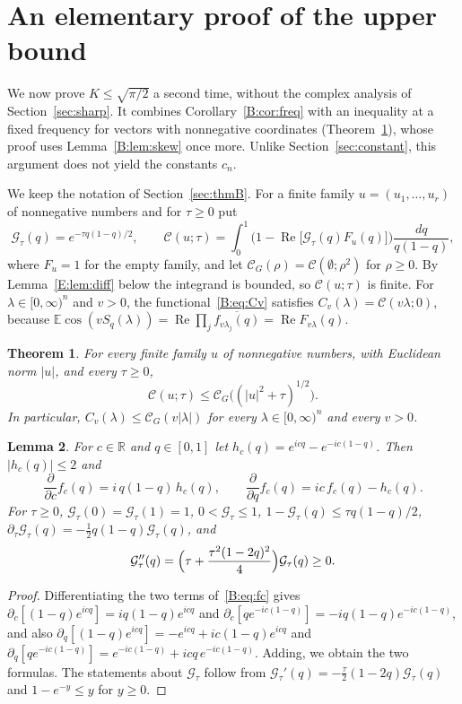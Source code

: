 \documentclass[11pt]{amsart}
\newtheorem{theorem}{Theorem}[section]
\newtheorem{lemma}[theorem]{Lemma}
\theoremstyle{remark}
\numberwithin{equation}{section}
\newcommand{\R}{\mathbb{R}}
\newcommand{\E}{\mathbb{E}}
\begin{document}
\section{An elementary proof of the upper bound}\label{sec:elem}

We now prove $K\le\sqrt{\pi/2}$ a second time, without the complex analysis of Section~\ref{sec:sharp}. It combines Corollary~\ref{B:cor:freq} with an inequality at a fixed frequency for vectors with nonnegative coordinates (Theorem~\ref{E:thm:pfa}), whose proof uses Lemma~\ref{B:lem:skew} once more. Unlike Section~\ref{sec:constant}, this argument does not yield the constants $c_n$.

We keep the notation of Section~\ref{sec:thmB}. For a finite family $u=(u_1,\dots,u_r)$ of nonnegative numbers and for $\tau\ge0$ put
\[
\mathcal G_\tau(q)=e^{-\tau q(1-q)/2},\qquad \mathcal C(u;\tau)=\int_0^1\bigl(1-\operatorname{Re}\bigl[\mathcal G_\tau(q)F_u(q)\bigr]\bigr)\frac{dq}{q(1-q)},
\]
where $F_u=1$ for the empty family, and let $\mathcal C_G(\rho)=\mathcal C(\emptyset;\rho^2)$ for $\rho\ge0$. By Lemma~\ref{E:lem:diff} below the integrand is bounded, so $\mathcal C(u;\tau)$ is finite. For $\lambda\in[0,\infty)^n$ and $v>0$, the functional~\eqref{B:eq:Cv} satisfies $C_v(\lambda)=\mathcal C(v\lambda;0)$, because $\E\cos(vS_q(\lambda))=\operatorname{Re}\prod_j\overline{f_{v\lambda_j}(q)}=\operatorname{Re}F_{v\lambda}(q)$.

\begin{theorem}\label{E:thm:pfa}
For every finite family $u$ of nonnegative numbers, with Euclidean norm $|u|$, and every $\tau\ge0$,
\[
\mathcal C(u;\tau)\le\mathcal C_G\bigl((|u|^2+\tau)^{1/2}\bigr).
\]
In particular, $C_v(\lambda)\le\mathcal C_G(v|\lambda|)$ for every $\lambda\in[0,\infty)^n$ and every $v>0$.
\end{theorem}

\begin{lemma}\label{E:lem:ident}
For $c\in\R$ and $q\in[0,1]$ let $h_c(q)=e^{icq}-e^{-ic(1-q)}$. Then $|h_c(q)|\le2$ and
\[
\frac{\partial}{\partial c}f_c(q)=i\,q(1-q)\,h_c(q),\qquad \frac{\partial}{\partial q}f_c(q)=ic\,f_c(q)-h_c(q).
\]
For $\tau\ge0$, $\mathcal G_\tau(0)=\mathcal G_\tau(1)=1$, $0<\mathcal G_\tau\le1$, $1-\mathcal G_\tau(q)\le\tau q(1-q)/2$, $\partial_\tau \mathcal G_\tau(q)=-\frac12q(1-q)\mathcal G_\tau(q)$, and
\[
\mathcal G_\tau''(q)=\Bigl(\tau+\frac{\tau^2(1-2q)^2}4\Bigr)\mathcal G_\tau(q)\ge0.
\]
\end{lemma}

\begin{proof}
Differentiating the two terms of~\eqref{B:eq:fc} gives $\partial_c[(1-q)e^{icq}]=iq(1-q)e^{icq}$ and $\partial_c[qe^{-ic(1-q)}]=-iq(1-q)e^{-ic(1-q)}$, and also $\partial_q[(1-q)e^{icq}]=-e^{icq}+ic(1-q)e^{icq}$ and $\partial_q[qe^{-ic(1-q)}]=e^{-ic(1-q)}+icq\,e^{-ic(1-q)}$. Adding, we obtain the two formulas. The statements about $\mathcal G_\tau$ follow from $\mathcal G_\tau'(q)=-\frac\tau2(1-2q)\mathcal G_\tau(q)$ and $1-e^{-y}\le y$ for $y\ge0$.
\end{proof}
\end{document}
